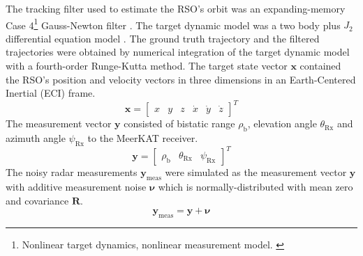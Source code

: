 \documentclass[conference]{IEEEtran}
\begin{document}
The tracking filter used to estimate the RSO's orbit was an expanding-memory Case 4\footnote{Nonlinear target dynamics, nonlinear measurement model. \cite{trackingfilterengineering}} Gauss-Newton filter \cite{trackingfilterengineering}. The target dynamic model was a two body plus $J_2$ differential equation model \cite{tapley2004}. The ground truth trajectory and the filtered trajectories were obtained by numerical integration of the target dynamic model with a fourth-order Runge-Kutta method. The target state vector $\mathbf{x}$ contained the RSO's position and velocity vectors in three dimensions in an Earth-Centered Inertial (ECI) frame. 
\begin{equation}
\mathbf{x} = \begin{bmatrix}
x & y & z & \dot{x} & \dot{y} & \dot{z}
\end{bmatrix}^T
\end{equation}
The measurement vector $\mathbf{y}$ consisted of bistatic range $\rho_\text{b}$, elevation angle $\theta_{\text{Rx}}$ and azimuth angle $\psi_{\text{Rx}}$ to the MeerKAT receiver.
\begin{equation}
\mathbf{y} = \begin{bmatrix}
\rho_\text{b} & \theta_{\text{Rx}} & \psi_{\text{Rx}}
\end{bmatrix}^T
\end{equation}
The noisy radar measurements $ \mathbf{y}_{\text{meas}}$ were simulated as the measurement vector $\mathbf{y}$ with additive measurement noise $\mathbf{\nu}$ which is normally-distributed with mean zero and covariance $\mathbf{R}$.
\begin{equation}
\mathbf{y}_{\text{meas}}= \mathbf{y} + \mathbf{\nu}
\end{equation}
\end{document}
